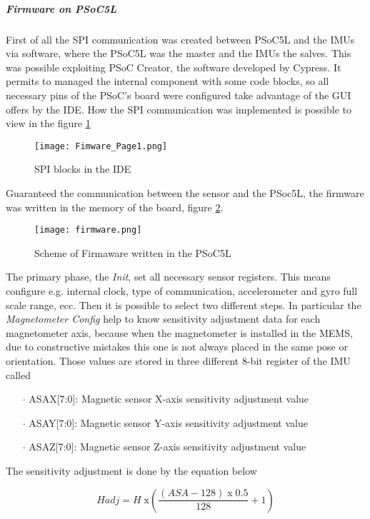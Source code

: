 \subparagraph{Firmware on PSoC5L}

\noindent First of all the SPI communication was created between PSoC5L and the IMUs via software, where the PSoC5L  was the master and the IMUs the salves.  This was possible exploiting PSoC Creator, the software developed by Cypress. It permits to managed the internal component with some code blocks, so all necessary pins of the PSoC's board were configured take advantage of the GUI offers by the IDE.   How the SPI communication was implemented is possible to view in the figure \ref{fig:firmwarepage1}
\begin{figure}[h]
\centering
\texttt{[image: Fimware\_Page1.png]}
\caption{SPI blocks in the IDE}
\label{fig:firmwarepage1}
\end{figure}  

Guaranteed the communication between the sensor and the PSoc5L,  the firmware was written in the memory of the board, figure \ref{fig:psocfirmware}. 
\begin{figure}[h]
\centering
\texttt{[image: firmware.png]}
\caption{Scheme of Firmaware written in the PSoC5L}
\label{fig:psocfirmware}
\end{figure}  
\noindent The primary phase, the  \textit{Init}, set all necessary sensor registers. This means configure e.g. internal clock,   type of communication, accelerometer and gyro full scale range, ecc. Then it is possible to select two different steps. In particular the \textit{Magnetometer Config} help to know sensitivity adjustment data for each magnetometer axis, because when the magnetometer is installed in the MEMS, due to constructive mistakes this one is not always placed in the same pose or orientation. Those values are stored in three different 8-bit register of  the IMU called
\begin{enumerate}
\item[$\cdot$] ASAX[7:0]: Magnetic sensor X-axis sensitivity adjustment value
\item[$\cdot$] ASAY[7:0]: Magnetic sensor Y-axis sensitivity adjustment value
\item[$\cdot$] ASAZ[7:0]: Magnetic sensor Z-axis sensitivity adjustment value
\end{enumerate}

\noindent The sensitivity adjustment is done by the equation below

\begin{equation}
\displaystyle Hadj = H \;  \text{x} \left(          \frac{ \left(ASA - 128\right)\; \text{x} \; 0.5 }{128} + 1        \right)
\end{equation} 

